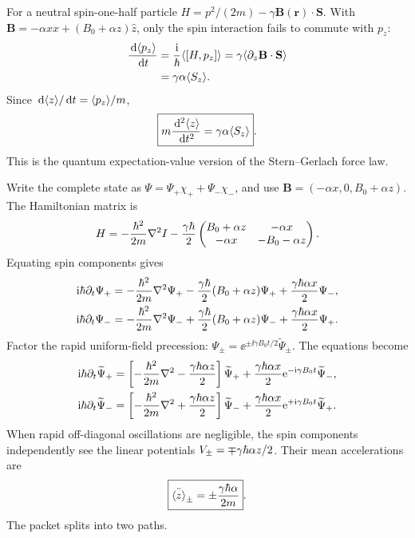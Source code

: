 For a neutral spin-one-half particle
$H=p^2/(2m)-\gamma\mathbf B(\mathbf r)\cdot\mathbf S$.
With
$\mathbf B=-\alpha x\hat x+
(B_0+\alpha z)\hat z$,
only the spin interaction fails
to commute with $p_z$:
\begin{align}
\frac{\,\mathrm d\langle p_z\rangle}{\,\mathrm d t}
&=\frac{\mathrm i}{\hbar}
\langle [H,p_z]\rangle
=\gamma\langle \partial_z\mathbf B\cdot\mathbf S\rangle\\
&=\gamma\alpha\langle S_z\rangle.
\end{align}
Since $\,\mathrm d\langle z\rangle/\,\mathrm d t=\langle p_z\rangle/m$,
\begin{equation}
\boxed{m\frac{\,\mathrm d^2\langle z\rangle}{\,\mathrm d t^2}
=\gamma\alpha\langle S_z\rangle}.
\end{equation}
This is the quantum expectation-value
version of the Stern--Gerlach force law.

Write the complete state as
$\Psi=\Psi_+\chi_++\Psi_-\chi_-$,
and use
$\mathbf B=(-\alpha x,0,B_0+\alpha z)$.
The Hamiltonian matrix is
\begin{equation}
H=-\frac{\hbar^2}{2m}\nabla^2I
-\frac{\gamma\hbar}{2}
\begin{pmatrix}
B_0+\alpha z&-\alpha x\\
-\alpha x&-B_0-\alpha z
\end{pmatrix}.
\end{equation}
Equating spin components gives
\begin{align}
\mathrm i\hbar\partial_t\Psi_+
&=-\frac{\hbar^2}{2m}\nabla^2\Psi_+
-\frac{\gamma\hbar}{2}(B_0+\alpha z)\Psi_+
+\frac{\gamma\hbar\alpha x}{2}\Psi_-,\\
\mathrm i\hbar\partial_t\Psi_-
&=-\frac{\hbar^2}{2m}\nabla^2\Psi_-
+\frac{\gamma\hbar}{2}(B_0+\alpha z)\Psi_-
+\frac{\gamma\hbar\alpha x}{2}\Psi_+.
\end{align}
Factor the rapid uniform-field precession:
$\Psi_\pm=\ee^{\pm\ii\gamma B_0t/2}
\widetilde\Psi_\pm$. The equations become
\begin{align}
\mathrm i\hbar\partial_t\widetilde\Psi_+
&=\left[-\frac{\hbar^2}{2m}\nabla^2
-\frac{\gamma\hbar\alpha z}{2}\right]\widetilde\Psi_+
+\frac{\gamma\hbar\alpha x}{2}
\mathrm e^{-\mathrm i\gamma B_0t}\widetilde\Psi_-,\\
\mathrm i\hbar\partial_t\widetilde\Psi_-
&=\left[-\frac{\hbar^2}{2m}\nabla^2
+\frac{\gamma\hbar\alpha z}{2}\right]\widetilde\Psi_-
+\frac{\gamma\hbar\alpha x}{2}
\mathrm e^{+\mathrm i\gamma B_0t}\widetilde\Psi_+.
\end{align}
When rapid off-diagonal oscillations are
negligible, the spin components independently
see the linear potentials
$V_\pm=\mp\gamma\hbar\alpha z/2$.
Their mean accelerations are
\begin{equation}
\boxed{\ddot{\langle z\rangle}_\pm
=\pm\frac{\gamma\hbar\alpha}{2m}}.
\end{equation}
The packet splits into two paths.

